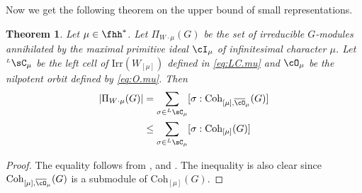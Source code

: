 \documentclass[12pt,a4paper]{amsart}
\def\abs#1{\left|{#1}\right|}
\DeclareMathOperator{\Ann}{Ann}
\numberwithin{equation}{section}
\newtheorem{thm}{Theorem}[section]
\newtheorem{cor}[thm]{Corollary}
\theoremstyle{remark}
\def\Irr{\mathrm{Irr}}
\def\LC{{}^{\scriptscriptstyle L}\sC}
\def\Coh{\mathrm{Coh}}
\newcommand{\Grt}{\cK}
\begin{document}
\medskip

Now we get the following theorem on the upper bound of small representations.
\begin{thm}
  Let $\mu\in \fhh^{*}$. Let $\Pi_{W\cdot \mu}(G)$ be the set of irreducible
  $G$-modules annihilated by the maximal primitive ideal $\cI_{\mu}$ of
  infinitesimal character $\mu$. Let $\LC_{\mu}$ be the left cell of
  $\Irr(W_{[\mu]})$ defined in \eqref{eq:LC.mu} and $\cO_{\mu}$ be the nilpotent
  orbit defined by \eqref{eq:O.mu}. Then
  \[
    \begin{split}
      \abs{\Pi_{W\cdot \mu}(G)} &= \sum_{\sigma\in \LC_{\mu}}
      [\sigma:\Coh_{[\mu],\bcO_{\mu}}(G)]\\
      &\leq \sum_{\sigma\in \LC_{\mu}}
      [\sigma:\Coh_{[\mu]}(G)]\\
    \end{split}
  \]
\end{thm}
\begin{proof}
  The equality follows from ,  and
  . The inequality is also clear since
  $\Coh_{[\mu],\bcO_{\mu}}(G)$ is a submodule of $\Coh_{[\mu]}(G)$.
\end{proof}




\end{document}
